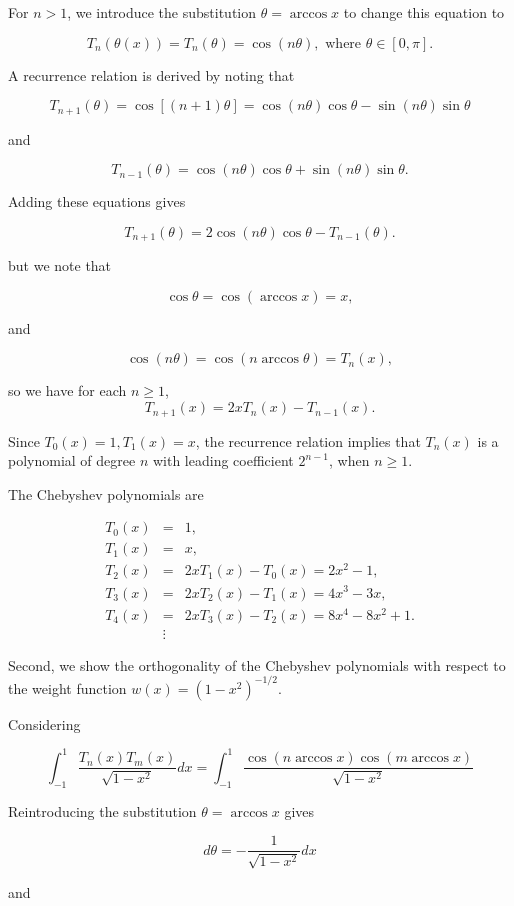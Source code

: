 \documentclass[preprint,12pt]{elsarticle}
\begin{document}
For $n>1$, we introduce the substitution $\theta =\arccos x$ to change this equation to

\[
T_n(\theta(x))=T_n(\theta)=\cos (n\theta), \text{ where }\theta\in [0,\pi].
\]

A recurrence relation is derived by noting that

\[
T_{n+1}(\theta)=\cos[(n+1)\theta]=\cos(n\theta)\cos \theta- \sin(n\theta)\sin\theta\]

and

\[
T_{n-1}(\theta) = \cos(n\theta) \cos \theta + \sin(n\theta) \sin\theta.
\]

Adding these equations gives

\[
T_{n+1}(\theta) = 2\cos(n\theta)\cos\theta - T_{n-1}(\theta).
\]

but we note that

\[\cos \theta=\cos(\arccos x)=x,\]

and

\[\cos(n\theta)=\cos(n\arccos \theta)=T_n(x),\]

so we have for each $n\ge 1$,
\[
T_{n+1}(x)=2xT_n(x)-T_{n-1}(x).
\]

Since $T_0(x)=1, T_1(x)=x$,  the recurrence relation
implies that $T_n(x)$ is a polynomial of degree $n$ with leading
coefficient $2^{n-1}$, when $n\ge 1$.

The Chebyshev polynomials are

\begin{eqnarray*}
  T_0(x) &=& 1, \\
  T_1(x) &=& x, \\
  T_2(x) &=& 2xT_1(x) - T_0(x) = 2x^2 - 1,\\
  T_3(x) &=& 2xT_2(x) - T_1(x) =4x^3 - 3x,\\
  T_4(x) &=& 2xT_3(x) - T_2(x) = 8x^4 - 8x^2 + 1.\\
         &\vdots&
\end{eqnarray*}

Second, we show the orthogonality of the Chebyshev polynomials with respect to the weight function $w(x)=(1-x^2)^{-1/2}$.

Considering

\[
\int_{-1}^1 \frac{T_n(x)T_m(x)}{\sqrt{1-x^2}}dx=\int_{-1}^1
\frac{\cos(n\arccos x)\cos(m\arccos x)}{\sqrt{1-x^2}}
\]

Reintroducing the substitution $\theta = \arccos x$ gives

\[
d\theta=-\frac{1}{\sqrt{1-x^2}}dx
\]

and
\end{document}

